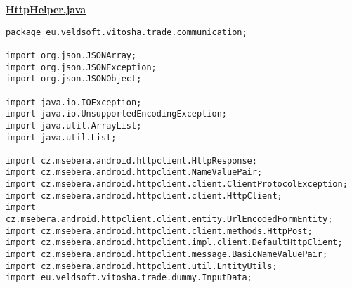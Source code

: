 \textbf{\underline{HttpHelper.java}}
\begin{verbatim}
package eu.veldsoft.vitosha.trade.communication;

import org.json.JSONArray;
import org.json.JSONException;
import org.json.JSONObject;

import java.io.IOException;
import java.io.UnsupportedEncodingException;
import java.util.ArrayList;
import java.util.List;

import cz.msebera.android.httpclient.HttpResponse;
import cz.msebera.android.httpclient.NameValuePair;
import cz.msebera.android.httpclient.client.ClientProtocolException;
import cz.msebera.android.httpclient.client.HttpClient;
import cz.msebera.android.httpclient.client.entity.UrlEncodedFormEntity;
import cz.msebera.android.httpclient.client.methods.HttpPost;
import cz.msebera.android.httpclient.impl.client.DefaultHttpClient;
import cz.msebera.android.httpclient.message.BasicNameValuePair;
import cz.msebera.android.httpclient.util.EntityUtils;
import eu.veldsoft.vitosha.trade.dummy.InputData;


\end{verbatim}
